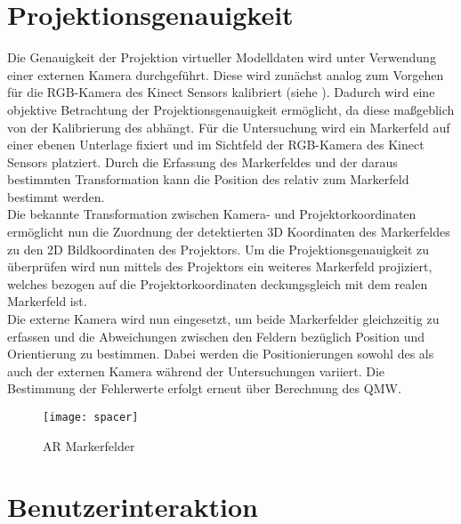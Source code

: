 \section{Projektionsgenauigkeit}
Die Genauigkeit der Projektion virtueller Modelldaten wird unter Verwendung einer externen Kamera durchgeführt. Diese wird zunächst analog zum Vorgehen für die RGB-Kamera des Kinect Sensors kalibriert (siehe ). Dadurch wird eine objektive Betrachtung der Projektionsgenauigkeit ermöglicht, da diese maßgeblich von der Kalibrierung des  abhängt. Für die Untersuchung wird ein Markerfeld auf einer ebenen Unterlage fixiert und im Sichtfeld der RGB-Kamera des Kinect Sensors platziert. Durch die Erfassung des Markerfeldes und der daraus bestimmten Transformation kann die Position des  relativ zum Markerfeld bestimmt werden.\\
Die bekannte Transformation zwischen Kamera- und Projektorkoordinaten ermöglicht nun die Zuordnung der detektierten 3D Koordinaten des Markerfeldes zu den 2D Bildkoordinaten des Projektors. Um die Projektionsgenauigkeit zu überprüfen wird nun mittels des Projektors ein weiteres Markerfeld projiziert, welches bezogen auf die Projektorkoordinaten deckungsgleich mit dem realen Markerfeld ist. \\
Die externe Kamera wird nun eingesetzt, um beide Markerfelder gleichzeitig zu erfassen und die Abweichungen zwischen den Feldern bezüglich Position und Orientierung zu bestimmen. Dabei werden die Positionierungen sowohl des  als auch der externen Kamera während der Untersuchungen variiert. Die Bestimmung der Fehlerwerte erfolgt erneut über Berechnung des QMW.

\begin{figure}[!ht]
	\begin{center}
		\texttt{[image: spacer]}
		\caption{AR Markerfelder}
		\label{fig.armarker}
	\end{center}
\end{figure}


\section{Benutzerinteraktion}